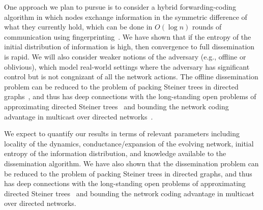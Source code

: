 One approach we plan to pursue is to consider a hybrid
forwarding-coding algorithm in which nodes exchange information in the
symmetric difference of what they currently hold, which can be done in
$O(\log n)$ rounds of communication using
fingerprinting~\cite{mitzenmacher-2005-fastmixing}.  We have shown 
that if the entropy of the initial distribution of information
is high, then convergence to full dissemination is rapid.  We will
also consider weaker notions of the adversary (e.g., offline or
oblivious), which model real-world settings where the adversary has
significant control but is not congnizant of all the network actions.
The offline dissemination problem can be reduced to the problem of
packing Steiner trees in directed
graphs~\cite{cheriyan+s:steiner,dutta+prs:dynamic}, and thus has deep
connections with the long-standing open problems of approximating
directed Steiner
trees~\cite{charikar+ccdgg:steiner,zosin+k:steiner,halperin+k:steiner}
and bounding the network coding advantage in multicast over directed
networks~\cite{agarwal+c:coding,sanders+et:flow}.

We expect to quantify our results in terms of relevant parameters
including locality of the dynamics, conductance/expansion of the
evolving network, initial entropy of the information distribution, and
knowledge available to the dissemination algorithm.  We have also
shown that the dissemination problem can be reduced to the problem of
packing Steiner trees in directed graphs, and thus has deep
connections with the long-standing open problems of approximating
directed Steiner trees~\cite{charikar+ccdgg:steiner} and bounding the
network coding advantage in multicast over directed networks.

